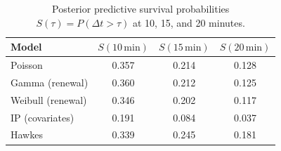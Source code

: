\begin{table}
\caption{Posterior predictive survival probabilities $S(\tau)=P(\Delta t>\tau)$ at 10, 15, and 20 minutes.}
\label{tab:exceedance}
\begin{tabular}{lccc}
\toprule
Model & $S(10\,\text{min})$ & $S(15\,\text{min})$ & $S(20\,\text{min})$ \\
\midrule
Poisson & 0.357 & 0.214 & 0.128 \\
Gamma (renewal) & 0.360 & 0.212 & 0.125 \\
Weibull (renewal) & 0.346 & 0.202 & 0.117 \\
IP (covariates) & 0.191 & 0.084 & 0.037 \\
Hawkes & 0.339 & 0.245 & 0.181 \\
\bottomrule
\end{tabular}
\end{table}
